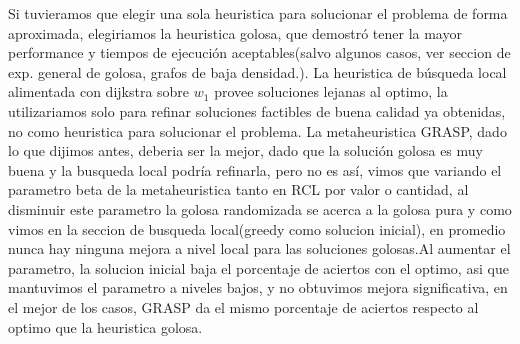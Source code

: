 Si tuvieramos que elegir una sola heuristica para solucionar el problema de forma aproximada, elegiriamos la heuristica golosa, que demostr\'o tener la mayor performance y tiempos de ejecuci\'on aceptables(salvo algunos casos, ver seccion de exp. general de golosa, grafos de baja densidad.). La heuristica de b\'usqueda local alimentada con dijkstra sobre $w_1$ provee soluciones lejanas al optimo, la utilizariamos solo para refinar soluciones factibles de buena calidad ya obtenidas, no como heuristica para solucionar el problema. La metaheuristica GRASP, dado lo que dijimos antes, deberia ser la mejor, dado que la soluci\'on golosa es muy buena y la busqueda local podr\'ia refinarla, pero no es as\'i, vimos que variando el parametro beta de la metaheuristica tanto en RCL por valor o cantidad, al disminuir este parametro la golosa randomizada se acerca a la golosa pura y como vimos en la seccion de busqueda local(greedy como solucion inicial), en promedio nunca hay ninguna mejora a nivel local para las soluciones golosas.Al aumentar el parametro, la solucion inicial baja el porcentaje de aciertos con el optimo, asi que mantuvimos el parametro a niveles bajos, y no obtuvimos mejora significativa, en el mejor de los casos, GRASP da el mismo porcentaje de aciertos respecto al optimo que la heuristica golosa.